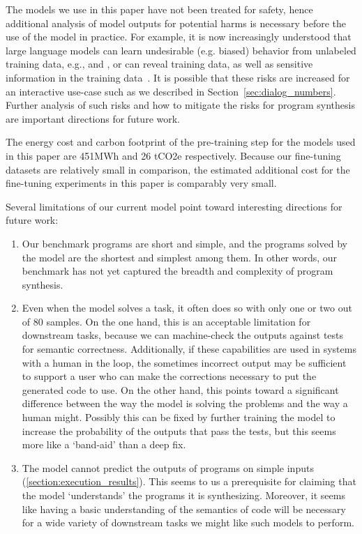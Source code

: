 The models we use in this paper have not been treated for safety, hence additional analysis of model outputs for potential harms is necessary before the use of the model in practice. For example, it is now increasingly understood that large language models can learn undesirable (e.g. biased) behavior from unlabeled training data, e.g., \cite{bender-koller-2020-climbing} and \cite{Bender2021-pd}, or can reveal training data, as well as sensitive information in the training data~\citep{carlini2020extracting}. It is possible that these risks are increased for an interactive use-case such as we described in Section~\ref{sec:dialog_numbers}.
Further analysis of such risks and how to mitigate the risks for program synthesis are important directions for future work.

The energy cost and carbon footprint of the pre-training step for the models used in this paper are 451MWh and 26 tCO2e respectively. Because our fine-tuning datasets are relatively small in comparison, the estimated additional cost for the fine-tuning experiments in this paper is comparably very small.

Several limitations of our current model point toward interesting directions for future work:

\begin{enumerate}
\item Our benchmark programs are short and simple, and the programs solved by the model are the shortest and simplest among them. In other words, our benchmark has not yet captured the breadth and complexity of program synthesis. 

\item Even when the model solves a task, it often does so with only one or two out of 80 samples. On the one hand, this is an acceptable limitation for downstream tasks, because we can machine-check the outputs against tests for semantic correctness. Additionally, if these capabilities are used in systems with a human in the loop, the sometimes incorrect output may be sufficient to support a user who can make the corrections necessary to put the generated code to use. On the other hand, this points toward a significant difference between the way the model is solving the problems and the way a human might. Possibly this can be fixed by further training the model to increase the probability of the outputs that pass the tests, but this seems more like a `band-aid' than a deep fix.

\item The model cannot predict the outputs of programs on simple inputs (\autoref{section:execution_results}). 
This seems to us a prerequisite for claiming that the model `understands' the programs it is synthesizing. Moreover, it seems like having a basic understanding of the semantics of code will be necessary for a wide variety of downstream tasks we might like such models to perform.
\end{enumerate}

